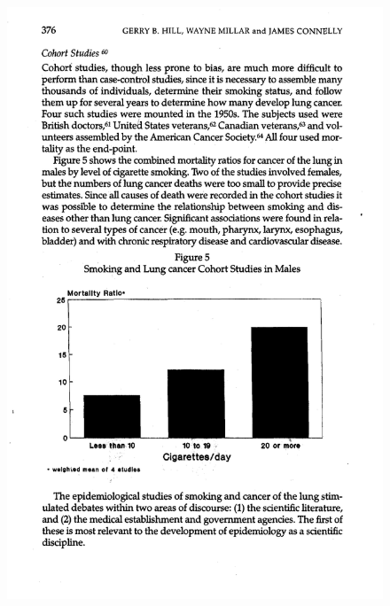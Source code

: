 \documentclass{beamer}
\begin{document}
\begin{frame}[plain]
	\begin{figure}
	\includegraphics[scale=0.5]{./lecture_includes/smoking_figure2.pdf}
	\end{figure}

\end{frame}	
	
\end{document}
